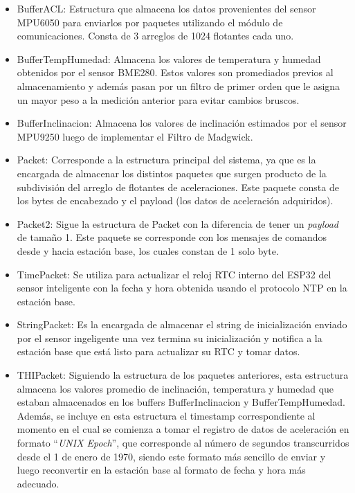 \begin{itemize}
    \item BufferACL: Estructura que almacena los datos provenientes del sensor MPU6050 para enviarlos por paquetes utilizando el módulo de comunicaciones. Consta de 3 arreglos de 1024 flotantes cada uno.
    \item BufferTempHumedad: Almacena los valores de temperatura y humedad obtenidos por el sensor BME280. Estos valores son promediados previos al almacenamiento y además pasan por un filtro de primer orden que le asigna un mayor peso a la medición anterior para evitar cambios bruscos.
    \item BufferInclinacion: Almacena los valores de inclinación estimados por el sensor MPU9250 luego de implementar el Filtro de Madgwick.
    \item Packet: Corresponde a la estructura principal del sistema, ya que es la encargada de almacenar los distintos paquetes que surgen producto de la subdivisión del arreglo de flotantes de aceleraciones. Este paquete consta de los bytes de encabezado y el payload (los datos de aceleración adquiridos).
    \item Packet2: Sigue la estructura de Packet con la diferencia de tener un \textit{payload} de tamaño 1. Este paquete se corresponde con los mensajes de comandos desde y hacia estación base, los cuales constan de 1 solo byte.
    \item TimePacket: Se utiliza para actualizar el reloj RTC interno del ESP32 del sensor inteligente con la fecha y hora obtenida usando el protocolo NTP en la estación base.
    \item StringPacket: Es la encargada de almacenar el string de inicialización enviado por el sensor ingeligente una vez termina su inicialización y notifica a la estación base que está listo para actualizar su RTC y tomar datos.
    \item THIPacket: Siguiendo la estructura de los paquetes anteriores, esta estructura almacena los valores promedio de inclinación, temperatura y humedad que estaban almacenados en los buffers BufferInclinacion y BufferTempHumedad. Además, se incluye en esta estructura el timestamp correspondiente al momento en el cual se comienza a tomar el registro de datos de aceleración en formato ``\textit{UNIX Epoch}'', que corresponde al número de segundos transcurridos desde el 1 de enero de 1970, siendo este formato más sencillo de enviar y luego reconvertir en la estación base al formato de fecha y hora más adecuado.
\end{itemize}


